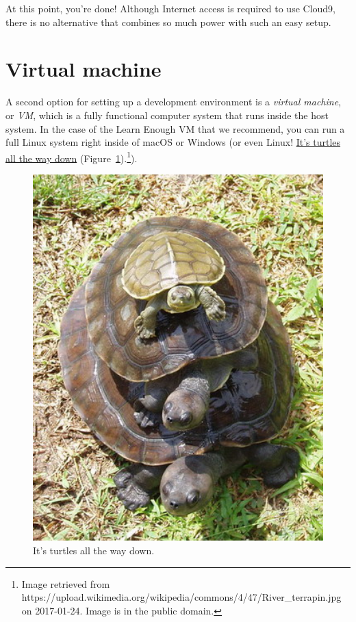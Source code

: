 At this point, you're done! Although Internet access is required to use Cloud9, there is no alternative that combines so much power with such an easy setup.


\section{Virtual machine} %
\label{sec:virtual_machine}

A second option for setting up a development environment is a \emph{virtual machine}, or \emph{VM}, which is a fully functional computer system that runs inside the host system. In the case of the Learn Enough VM that we recommend, you can run a full Linux system right inside of macOS or Windows (or even Linux! \href{https://en.wikipedia.org/wiki/Turtles_all_the_way_down}{It's turtles all the way down} (Figure~\ref{fig:turtles}).\footnote{Image retrieved from https://upload.wikimedia.org/wikipedia/commons/4/47/River\_terrapin.jpg on 2017-01-24. Image is in the public domain.}).

\begin{figure}
\begin{center}
\includegraphics[width=5.5in]{images/figures/turtles.jpg}
\end{center}
\caption{It's turtles all the way down.\label{fig:turtles}}
\end{figure}

